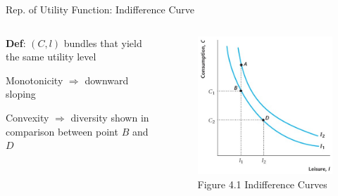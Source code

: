 \documentclass[11pt,aspectratio=169,usenames,dvipsnames]{beamer}
\let\tempone\itemize
\let\temptwo\enditemize
\renewenvironment{itemize}{\tempone\addtolength{\itemsep}{\fill}}{\temptwo}
\begin{document}
\begin{frame}{Rep. of Utility Function: Indifference Curve}
\label{slide:Representation_of_Utility_Function__Indifference_Curve}
\begin{columns}
    \begin{column}{0.5\textwidth}
        \begin{itemize}
            \item \textbf{Def}: $ ( C, l ) $ bundles that yield \alert{the same} utility level
            \item \alert{Monotonicity} $ \Rightarrow  $ downward sloping
            \item \alert{Convexity} $ \Rightarrow  $ diversity shown in comparison between point $ B $ and $ D $
        \end{itemize}
    \end{column}
    \begin{column}{0.5\textwidth}
        \begin{figure}
            \caption{Figure 4.1 Indifference Curves}
            \includegraphics[width=.8\textwidth]{./figures/Figure4_1.jpg}
        \end{figure}
    \end{column}
\end{columns}
\end{frame}
\end{document}
